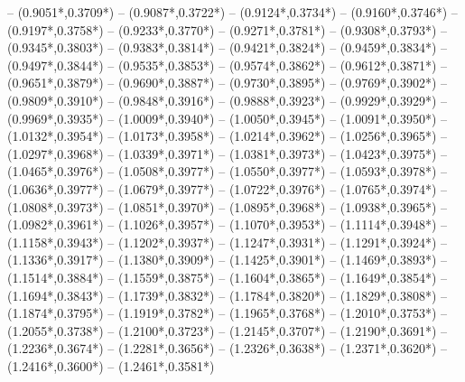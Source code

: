 {	-- ({0.9051*\dx},{0.3709*\dy})
	-- ({0.9087*\dx},{0.3722*\dy})
	-- ({0.9124*\dx},{0.3734*\dy})
	-- ({0.9160*\dx},{0.3746*\dy})
	-- ({0.9197*\dx},{0.3758*\dy})
	-- ({0.9233*\dx},{0.3770*\dy})
	-- ({0.9271*\dx},{0.3781*\dy})
	-- ({0.9308*\dx},{0.3793*\dy})
	-- ({0.9345*\dx},{0.3803*\dy})
	-- ({0.9383*\dx},{0.3814*\dy})
	-- ({0.9421*\dx},{0.3824*\dy})
	-- ({0.9459*\dx},{0.3834*\dy})
	-- ({0.9497*\dx},{0.3844*\dy})
	-- ({0.9535*\dx},{0.3853*\dy})
	-- ({0.9574*\dx},{0.3862*\dy})
	-- ({0.9612*\dx},{0.3871*\dy})
	-- ({0.9651*\dx},{0.3879*\dy})
	-- ({0.9690*\dx},{0.3887*\dy})
	-- ({0.9730*\dx},{0.3895*\dy})
	-- ({0.9769*\dx},{0.3902*\dy})
	-- ({0.9809*\dx},{0.3910*\dy})
	-- ({0.9848*\dx},{0.3916*\dy})
	-- ({0.9888*\dx},{0.3923*\dy})
	-- ({0.9929*\dx},{0.3929*\dy})
	-- ({0.9969*\dx},{0.3935*\dy})
	-- ({1.0009*\dx},{0.3940*\dy})
	-- ({1.0050*\dx},{0.3945*\dy})
	-- ({1.0091*\dx},{0.3950*\dy})
	-- ({1.0132*\dx},{0.3954*\dy})
	-- ({1.0173*\dx},{0.3958*\dy})
	-- ({1.0214*\dx},{0.3962*\dy})
	-- ({1.0256*\dx},{0.3965*\dy})
	-- ({1.0297*\dx},{0.3968*\dy})
	-- ({1.0339*\dx},{0.3971*\dy})
	-- ({1.0381*\dx},{0.3973*\dy})
	-- ({1.0423*\dx},{0.3975*\dy})
	-- ({1.0465*\dx},{0.3976*\dy})
	-- ({1.0508*\dx},{0.3977*\dy})
	-- ({1.0550*\dx},{0.3977*\dy})
	-- ({1.0593*\dx},{0.3978*\dy})
	-- ({1.0636*\dx},{0.3977*\dy})
	-- ({1.0679*\dx},{0.3977*\dy})
	-- ({1.0722*\dx},{0.3976*\dy})
	-- ({1.0765*\dx},{0.3974*\dy})
	-- ({1.0808*\dx},{0.3973*\dy})
	-- ({1.0851*\dx},{0.3970*\dy})
	-- ({1.0895*\dx},{0.3968*\dy})
	-- ({1.0938*\dx},{0.3965*\dy})
	-- ({1.0982*\dx},{0.3961*\dy})
	-- ({1.1026*\dx},{0.3957*\dy})
	-- ({1.1070*\dx},{0.3953*\dy})
	-- ({1.1114*\dx},{0.3948*\dy})
	-- ({1.1158*\dx},{0.3943*\dy})
	-- ({1.1202*\dx},{0.3937*\dy})
	-- ({1.1247*\dx},{0.3931*\dy})
	-- ({1.1291*\dx},{0.3924*\dy})
	-- ({1.1336*\dx},{0.3917*\dy})
	-- ({1.1380*\dx},{0.3909*\dy})
	-- ({1.1425*\dx},{0.3901*\dy})
	-- ({1.1469*\dx},{0.3893*\dy})
	-- ({1.1514*\dx},{0.3884*\dy})
	-- ({1.1559*\dx},{0.3875*\dy})
	-- ({1.1604*\dx},{0.3865*\dy})
	-- ({1.1649*\dx},{0.3854*\dy})
	-- ({1.1694*\dx},{0.3843*\dy})
	-- ({1.1739*\dx},{0.3832*\dy})
	-- ({1.1784*\dx},{0.3820*\dy})
	-- ({1.1829*\dx},{0.3808*\dy})
	-- ({1.1874*\dx},{0.3795*\dy})
	-- ({1.1919*\dx},{0.3782*\dy})
	-- ({1.1965*\dx},{0.3768*\dy})
	-- ({1.2010*\dx},{0.3753*\dy})
	-- ({1.2055*\dx},{0.3738*\dy})
	-- ({1.2100*\dx},{0.3723*\dy})
	-- ({1.2145*\dx},{0.3707*\dy})
	-- ({1.2190*\dx},{0.3691*\dy})
	-- ({1.2236*\dx},{0.3674*\dy})
	-- ({1.2281*\dx},{0.3656*\dy})
	-- ({1.2326*\dx},{0.3638*\dy})
	-- ({1.2371*\dx},{0.3620*\dy})
	-- ({1.2416*\dx},{0.3600*\dy})
	-- ({1.2461*\dx},{0.3581*\dy})
}
